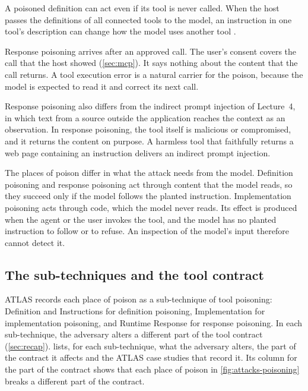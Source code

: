 A poisoned definition can act even if its tool is never called. When the host passes the
definitions of all connected tools to the model, an instruction in one tool's description can
change how the model uses another tool \citep{beurerkellner2025toolpoisoning}.

Response poisoning arrives after an approved call. The user's consent covers the call that the host
showed (\cref{sec:mcp}). It says nothing about the content that the call returns. A tool execution
error is a natural carrier for the poison, because the model is expected to read it and correct its
next call.

Response poisoning also differs from the indirect prompt injection of Lecture~4, in which text from a
source outside the application reaches the context as an observation. In response poisoning, the
tool itself is malicious or compromised, and it returns the content on purpose. A harmless tool that
faithfully returns a web page containing an instruction delivers an indirect prompt injection.

The places of poison differ in what the attack needs from the model. Definition poisoning and
response poisoning act through content that the model reads, so they succeed only if the model
follows the planted instruction. Implementation poisoning acts through code, which the model never
reads. Its effect is produced when the agent or the user invokes the tool, and the model has no
planted instruction to follow or to refuse. An inspection of the model's input therefore cannot
detect it.

\subsection{The sub-techniques and the tool contract}
\label{sec:attacks-subtechniques}

ATLAS records each place of poison as a sub-technique of tool poisoning: Definition and
Instructions for definition poisoning, Implementation for implementation poisoning, and Runtime
Response for response poisoning. In each sub-technique, the adversary alters a different part of
the tool contract (\cref{sec:recap}).  lists, for each sub-technique, what the adversary alters, the part
of the contract it affects and the ATLAS case studies that record it. Its column for the part of the
contract shows that each place of poison in \cref{fig:attacks-poisoning} breaks a different part of
the contract.

